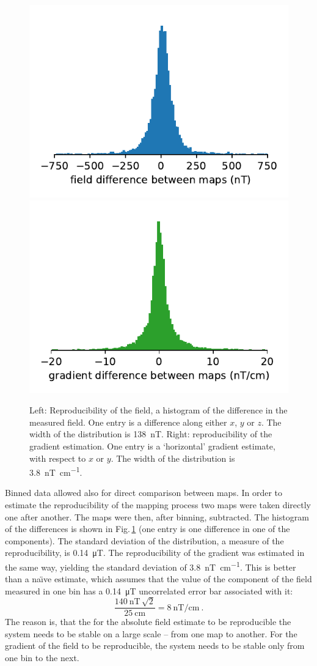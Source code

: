\begin{figure}
  \centering
  \includegraphics[width=0.49\linewidth]{gfx/mapping/lpsc/reproducibility_field.pdf}
  \includegraphics[width=0.49\linewidth]{gfx/mapping/lpsc/reproducibility_gradient.pdf}
  \caption{Left: Reproducibility of the field, a histogram of the difference in the measured field. One entry is a difference along either $x$, $y$ or $z$. The width of the distribution is \SI{138}{\nano\tesla}. Right: reproducibility of the gradient estimation. One entry is a `horizontal' gradient estimate, with respect to $x$ or $y$. The width of the distribution is \SI[per-mode=symbol]{3.8}{\nano\tesla\per\centi\metre}.}\label{fig:mapping_bastille_reproducibility}
\end{figure}

Binned data allowed also for direct comparison between maps. In order to estimate the reproducibility of the mapping process two maps were taken directly one after another. The maps were then, after binning, subtracted. The histogram of the differences is shown in Fig.\,\ref{fig:mapping_bastille_reproducibility} (one entry is one difference in one of the components). The standard deviation of the distribution, a measure of the reproducibility, is \SI{0.14}{\micro\tesla}. The reproducibility of the gradient was estimated in the same way, yielding the standard deviation of \SI[per-mode=symbol]{3.8}{\nano\tesla\per\centi\meter}. This is better than a na\"{\i}ve estimate, which assumes that the value of the component of the field measured in one bin has a \SI{0.14}{\micro\tesla} uncorrelated error bar associated with it:
\begin{equation}
  \frac{\SI{140}{\nano\tesla} \, \sqrt{2}}{\SI{25}{\centi\meter}} = \SI[per-mode=symbol]{8}{\nano\tesla\per\centi\meter} \ .
\end{equation}
The reason is, that the for the absolute field estimate to be reproducible the system needs to be stable on a large scale -- from one map to another. For the gradient of the field to be reproducible, the system needs to be stable only from one bin to the next.


